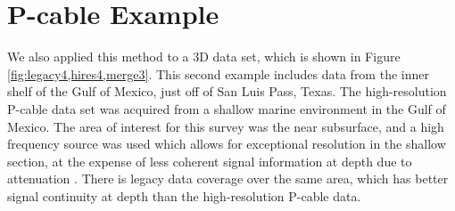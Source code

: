 \section{P-cable Example}
We also applied this method to a 3D data set, which is shown in Figure \ref{fig:legacy4,hires4,merge3}.
This second example includes data from the inner shelf of the Gulf of Mexico, just off of San Luis Pass, Texas. The high-resolution P-cable data set was acquired from a shallow marine environment in the Gulf of Mexico. 
The area of interest for this survey was the near subsurface, and a high frequency source was used which allows for exceptional resolution in the shallow section, at the expense of less coherent signal information at depth due to attenuation \cite[]{tip}. There is legacy data coverage over the same area, which has better signal continuity at depth than the high-resolution P-cable data. 


